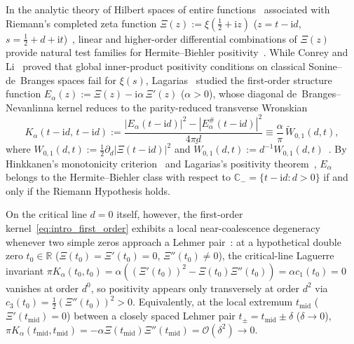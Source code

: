 \documentclass[11pt,reqno]{amsart}
\theoremstyle{definition}
\theoremstyle{remark}
\numberwithin{equation}{section}
\newcommand{\R}{\mathbb{R}}
\newcommand{\C}{\mathbb{C}}
\newcommand{\ii}{\mathrm{i}}
\begin{document}
In the analytic theory of Hilbert spaces of entire functions~\cite{debranges1968,debranges1986,debranges1992} associated with Riemann's completed zeta function $\Xi(z) := \xi(\frac{1}{2} + \ii z)$ ($z = t - \ii d$, $s = \frac{1}{2} + d + \ii t$)~\cite{riemann1859,polya1926,titchmarsh1986}, linear and higher-order differential combinations of $\Xi(z)$ provide natural test families for Hermite--Biehler positivity~\cite{jensen1913,lagarias1999,lagarias2006}. While Conrey and Li~\cite{conreyli2000} proved that global inner-product positivity conditions on classical Sonine--de~Branges spaces fail for $\xi(s)$, Lagarias~\cite{lagarias1999,lagarias2006} studied the first-order structure function $E_\alpha(z) := \Xi(z) - \ii\alpha\,\Xi'(z)$ ($\alpha > 0$), whose diagonal de~Branges--Nevanlinna kernel reduces to the parity-reduced transverse Wronskian
\begin{equation}\label{eq:intro_first_order}
K_\alpha(t - \ii d,\, t - \ii d) := \frac{|E_\alpha(t - \ii d)|^2 - |E_\alpha^\#(t - \ii d)|^2}{4\pi d} \equiv \frac{\alpha}{\pi}\,\widetilde{W}_{0,1}(d,t),
\end{equation}
where $W_{0,1}(d,t) := \frac{1}{2}\partial_d|\Xi(t-\ii d)|^2$ and $\widetilde{W}_{0,1}(d,t) := d^{-1}W_{0,1}(d,t)$~\cite{speiser1934,hinkkanen1997,csordas1986,griffin2019}. By Hinkkanen's monotonicity criterion~\cite{hinkkanen1997} and Lagarias's positivity theorem~\cite{lagarias1999}, $E_\alpha$ belongs to the Hermite--Biehler class with respect to $\C_- = \{t - \ii d : d > 0\}$ if and only if the Riemann Hypothesis holds.

On the critical line $d = 0$ itself, however, the first-order kernel~\eqref{eq:intro_first_order} exhibits a local near-coalescence degeneracy whenever two simple zeros approach a Lehmer pair~\cite{lehmer1956}: at a hypothetical double zero $t_0 \in \R$ ($\Xi(t_0) = \Xi'(t_0) = 0$, $\Xi''(t_0) \neq 0$), the critical-line Laguerre invariant $\pi K_\alpha(t_0, t_0) = \alpha((\Xi'(t_0))^2 - \Xi(t_0)\Xi''(t_0)) = \alpha c_1(t_0) = 0$ vanishes at order $d^0$, so positivity appears only transversely at order $d^2$ via $c_3(t_0) = \frac{1}{2}(\Xi''(t_0))^2 > 0$. Equivalently, at the local extremum $t_{\mathrm{mid}}$ ($\Xi'(t_{\mathrm{mid}}) = 0$) between a closely spaced Lehmer pair $t_\pm = t_{\mathrm{mid}} \pm \delta$ ($\delta \to 0$), $\pi K_\alpha(t_{\mathrm{mid}}, t_{\mathrm{mid}}) = -\alpha\Xi(t_{\mathrm{mid}})\Xi''(t_{\mathrm{mid}}) = \mathcal{O}(\delta^2) \to 0$.
\end{document}
